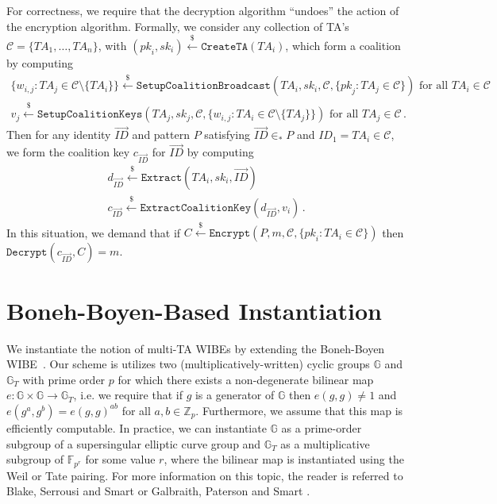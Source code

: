\documentclass[10pt]{llncs}
\newcommand{\C}{\mathcal{C}}
\newcommand{\Fbb}{\mathbb{F}}
\newcommand{\Gbb}{\mathbb{G}}
\newcommand{\Zbb}{\mathbb{Z}}
\newcommand{\ID}{\mathit{ID}}
\newcommand{\TA}{\mathit{TA}}
\newcommand{\pk}{\mathit{pk}}
\newcommand{\sk}{\mathit{sk}}
\newcommand{\getsr}{\stackrel{{\scriptscriptstyle\$}}{\gets}}
\begin{document}
For correctness, we require that the decryption algorithm ``undoes''
the action of the encryption algorithm. Formally, we consider any
collection of TA's $\C = \{\TA_{1},\ldots,\TA_{n}\}$, with
$(\pk_{i},\sk_{i}) \getsr \texttt{CreateTA}(\TA_{i})$, which form a
coalition by computing
\begin{displaymath}
\begin{array}{c}
\{ w_{i,j} : \TA_{j} \in \C \setminus \{ \TA_{i}\}\} \getsr
\texttt{SetupCoalitionBroadcast}(\TA_{i},\sk_{i},\C,\{\pk_{j} :
\TA_{j} \in \C\}) \mbox{ for all } \TA_{i} \in \C\\
v_{j} \getsr \texttt{SetupCoalitionKeys}(\TA_{j},\sk_{j},\C,\{w_{i,j}: \TA_{i}
\in \C \setminus \{\TA_{j}\}\}) \mbox{ for all } \TA_{j} \in \C \, .
\end{array}
\end{displaymath}
Then for any identity $\vec{\ID}$ and pattern $P$ satisfying
$\vec{\ID} \in_{*} P$ and $\ID_{1} = \TA_{i} \in \C$, we form the
coalition key $c_{\vec{\ID}}$ for $\vec{\ID}$ by computing
\begin{displaymath}
\begin{array}{c}
d_{\vec{\ID}} \getsr \texttt{Extract}(\TA_{i},\sk_{i},\vec{\ID})\\
c_{\vec{\ID}} \getsr \texttt{ExtractCoalitionKey}(d_{\vec{\ID}},v_{i}) \, .
\end{array}
\end{displaymath}
In this situation, we demand that if $C
\getsr \texttt{Encrypt}(P,m,\C,\{\pk_{i} : \TA_{i} \in \C\})$ then
$\texttt{Decrypt}(c_{\vec{\ID}},C) = m$.

\section{Boneh-Boyen-Based Instantiation}

We instantiate the notion of multi-TA WIBEs by extending the
Boneh-Boyen WIBE~\cite{Abdalla06}. Our scheme is utilizes two
(multiplicatively-written) cyclic groups $\Gbb$ and $\Gbb_{T}$ with
prime order $p$ for which there exists a non-degenerate bilinear map
$e : \Gbb \times \Gbb \rightarrow
\Gbb_{T}$, i.e. we require that if $g$ is a generator of $\Gbb$ then
$e(g,g) \neq 1$ and $e(g^{a},g^{b}) = e(g,g)^{ab}$ for all $a,b \in
\Zbb_{p}$. Furthermore, we assume that this map is efficiently
computable. In practice, we can instantiate $\Gbb$ as a prime-order
subgroup of a supersingular elliptic curve group and $\Gbb_{T}$ as a
multiplicative subgroup of $\Fbb_{p^{r}}$ for some value $r$, where
the bilinear map is instantiated using the Weil or Tate pairing. For
more information on this topic, the reader is referred to Blake,
Serrousi and Smart \cite{Blake99,Blake05} or Galbraith, Paterson and
Smart \cite{Galbraith08}.
\end{document}
